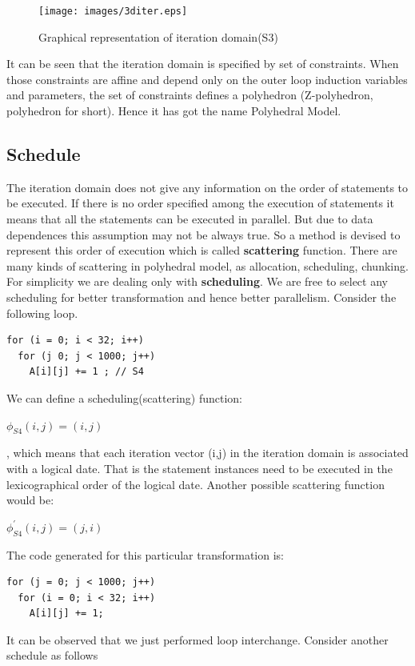 \begin{figure}
\begin{center}
  \texttt{[image: images/3diter.eps]}
  \caption{Graphical representation of iteration domain(S3)}
  \label{fig:3diter}
\end{center}  
\end{figure}


It can be seen that the iteration domain is specified by set of constraints. When those constraints are
affine and depend only on the outer loop induction variables and parameters, the set of constraints
defines a polyhedron (Z-polyhedron, polyhedron for short). Hence it has got the name Polyhedral Model.

\subsection{Schedule}

The iteration domain does not give any information on the order of statements to be executed. If there
is no order specified among the execution of statements it means that all the statements can be executed
in parallel. But due to data dependences this assumption may not be always true. So a method is devised
to represent this order of execution which is called \textbf{scattering} function. There are many
kinds of scattering in polyhedral model, as allocation, scheduling, chunking. For simplicity
we are dealing only with \textbf{scheduling}. We are free to select any scheduling for better
transformation and hence better parallelism.
Consider the following loop.
{\footnotesize
\begin{lstlisting}
for (i = 0; i < 32; i++)
  for (j 0; j < 1000; j++)
    A[i][j] += 1 ; // S4
\end{lstlisting}
}
\noindent
We can define a scheduling(scattering) function:
\begin{center}
$\phi_{S4}(i,j) = (i,j)$
\end{center}, which means that each iteration vector (i,j) in the iteration domain is associated with
a logical date. That is the statement instances need to be executed in the lexicographical order of the
logical date. Another possible scattering function would be:
\begin{center}
$\phi^{'}_{S4}(i,j) = (j,i)$
\end{center}
\noindent
The code generated for this particular transformation is:
{\footnotesize
\begin{lstlisting}
for (j = 0; j < 1000; j++)
  for (i = 0; i < 32; i++)
    A[i][j] += 1;
\end{lstlisting}
}
\noindent
It can be observed that we just performed loop interchange. Consider another
schedule as follows

